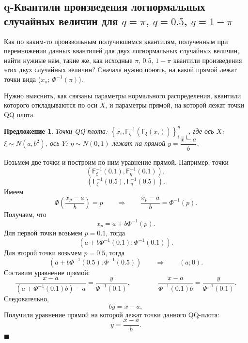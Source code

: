 \documentclass[12pt]{article}
\newtheorem{proposition}[theorem]{Предложение}
\newenvironment{Proof}{\par\noindent{\bf Доказательство.}}{\hfill$\scriptstyle\blacksquare$}
\begin{document}
	\subsection{q-Квантили произведения логнормальных случайных величин для $q=\pi$, $q=0.5$, $q=1-\pi$}	
	Как по каким-то произвольным получившимся квантилям, полученным при перемножении данных квантилей для двух логнормальных случайных величин, найти нужные нам, такие же, как исходные $\pi$, $0.5$, $1-\pi$ квантили произведения этих двух случайных величин? Cначала нужно понять, на какой прямой лежат точки вида ($x_{\pi}$; $\Phi^{-1}(\pi)$).
	
	Нужно выяснить, как связаны параметры нормального распределения, квантили которого откладываются по оси $X$, и параметры прямой, на которой лежат точки QQ плота.
	
	\begin{proposition}
	Точки QQ-плота: $\left\{x_{i},\mathsf{F}_{\eta}^{-1}(\mathsf{F}_{\xi}(x_{i}))\right\}_{i=1}^{n}$, где
	ось $X$: $\xi \sim N(a, b^{2})$, ось $Y$: $\eta \sim N(0, 1)$
	лежат на прямой $y = \dfrac{x-a}{b}$.
	\end{proposition}
	\begin{Proof}
	Возьмем две точки и построим по ним уравнение прямой. Например, точки
	\[(\mathsf{F}_{\xi}^{-1}(0.1), \mathsf{F}_{\eta}^{-1}(0.1)),\]
	\[(\mathsf{F}_{\xi}^{-1}(0.5), \mathsf{F}_{\eta}^{-1}(0.5)).\]
	Имеем
	\begin{equation*}
		\Phi\left(\dfrac{x_{p}-a}{b}\right)=p\quad\quad \Rightarrow \quad\quad \dfrac{x_{p}-a}{b}=\Phi^{-1}(p).
	\end{equation*}
	Получаем, что
	\begin{equation*}
		x_{p}=a+b\Phi^{-1}(p).
	\end{equation*}
	Для первой точки возьмем $p = 0.1$, тогда
	\[(a+b\Phi^{-1}(0.1); \Phi^{-1}(0.1)).\]
	Для второй точки возьмем $p = 0.5$, тогда
	\[(a+b\Phi^{-1}(0.5); \Phi^{-1}(0.5)) \quad\quad \Rightarrow \quad\quad (a;0). \]
	Составим уравнение прямой:
	\[\dfrac{x-a}{(a+\Phi^{-1}(0.1)b)-a} = \dfrac{y}{\Phi^{-1}(0.1)}, \quad\quad\quad\quad \dfrac{x-a}{\Phi^{-1}(0.1)b} = \dfrac{y}{\Phi^{-1}(0.1)}.\]
	Следовательно,
	\begin{equation*} 
		by = x-a,
	\end{equation*}
	Получили уравнение прямой на которой лежат точки данного QQ-плота:
	\begin{equation*}
		y = \dfrac{x-a}{b}.
	\end{equation*}
\end{Proof}
	
\end{document}
